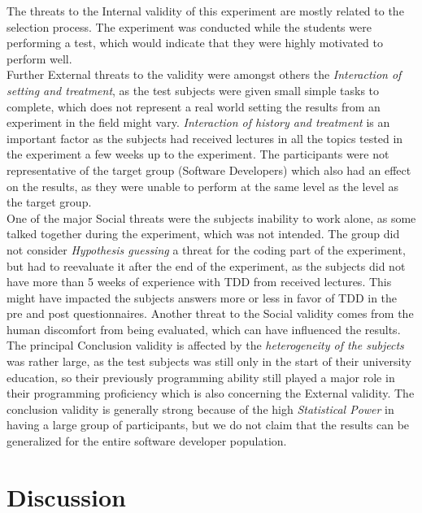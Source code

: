 \documentclass{sig-alternate-05-2015}
\begin{document}
The threats to the Internal validity of this experiment are mostly related to the selection process. The experiment was conducted while the students were performing a test, which would indicate that they were highly motivated to perform well.\\

Further External threats to the validity were amongst others the \textit{Interaction of setting and treatment}, as the test subjects were given small simple tasks to complete, which does not represent a real world setting the results from an experiment in the field might vary. \textit{Interaction of history and treatment} is an important factor as the subjects had received lectures in all the topics tested in the experiment a few weeks up to the experiment. The participants were not representative of the target group (Software Developers) which also had an effect on the results, as they were unable to perform at the same level as the level as the target group.\\

One of the major Social threats were the subjects inability to work alone, as some talked together during the experiment, which was not intended. The group did not consider \textit{Hypothesis guessing} a threat for the coding part of the experiment, but had to reevaluate it after the end of the experiment, as the subjects did not have more than 5  weeks of experience with TDD from received lectures. This might have impacted the subjects answers more or less in favor of TDD in the pre and post questionnaires. Another threat to the Social validity comes from the human discomfort from being evaluated, which can have influenced the results.\\

The principal Conclusion validity is affected by the \textit{heterogeneity of the subjects} was rather large, as the test subjects was still only in the start of their university education, so their previously programming ability still played a major role in their programming proficiency which is also concerning the External validity. The conclusion validity is generally strong because of the high \textit{Statistical Power} in having a large group of participants, but we do not claim that the results can be generalized for the entire software developer population. 

\section{Discussion}
\end{document}
